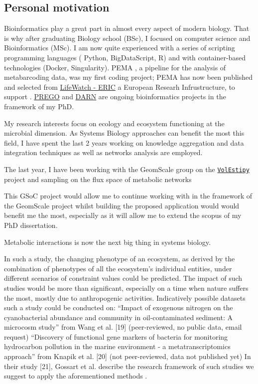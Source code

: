 \documentclass{article}
\begin{document}
\subsection{Personal motivation}

Bioinformatics play a great part in almost every aspect of modern biology.
That is why after graduating Biology school (BSc), I focused on computer science and Bioinformatics (MSc). 
I am now quite experienced with a series of scripting programming languages ( Python, BigDataScript, R) and with container-based technologies (Docker, Singularity).  
PEMA \cite{zafeiropoulos2020pema}, a pipeline for the analysis of metabarcoding data, was my first coding project; PEMA has now been published and selected from \href{https://www.lifewatch.eu/}{LifeWatch - ERIC} a European Researh Infrustructure, to support .
\href{http://prego.hcmr.gr/}{PREGO} and \href{https://github.com/hariszaf/darn/}{DARN} are ongoing bioinformatics projects in the framework of my PhD.

My research interests focus on ecology and ecosystem functioning at the microbial dimension.
As Systems Biology approaches can benefit the most this field, 
I have spent the last 2 years working on 
knowledge aggregation and data integration techniques as well as networks analysis are employed. 

The last year, I have been working with the GeomScale group on the \href{https://github.com/GeomScale/volume_approximation}{\texttt{\texttt{VolEsti}py}} project
and sampling on the flux space of metabolic networks 

This GSoC project would allow me to continue working with in the framework of the GeomScale project whilst building the proposed application would would benefit me the most, especially as it will allow me to extend the scopus of my PhD dissertation.

Metabolic interactions \cite{cai2020predicting} is now the next big thing in systems biology. 


In such a study, the changing phenotype of an ecosystem, as derived by the combination of phenotypes of all the ecosystem's individual entities, under different scenarios of constraint values could be predicted. 
The impact of such studies would be more than significant, especially on a time when nature suffers the most, mostly due to anthropogenic activities. 
Indicatively possible datasets such a study could be conducted on: 
“Impact of exogenous nitrogen on the cyanobacterial abundance and community in oil-contaminated sediment: A microcosm study” from Wang et al. [19] 
(peer-reviewed, no public data, email request)
“Discovery of functional gene markers of bacteria for monitoring hydrocarbon pollution in the marine environment - a metatranscriptomics approach” from Knapik et al. [20]
(not peer-reviewed, data not published yet)
In their study [21], Gossart et al.  describe the research framework of such studies we suggest to apply the aforementioned methods .
\end{document}
